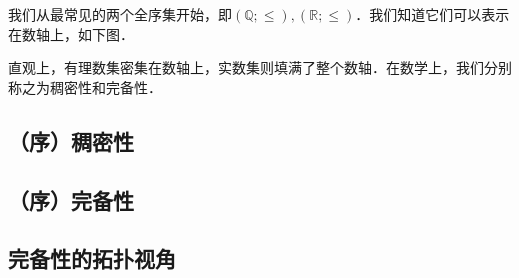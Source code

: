 
\begin{issues}
\issueDraft
\issueTODO
\end{issues}

我们从最常见的两个全序集开始，即$(\mathbb{Q};\leq),(\mathbb{R};\leq)$．我们知道它们可以表示在数轴上，如下图．


直观上，有理数集密集在数轴上，实数集则填满了整个数轴．在数学上，我们分别称之为稠密性和完备性．

\subsection{（序）稠密性}

\subsection{（序）完备性}

\subsection{完备性的拓扑视角}

